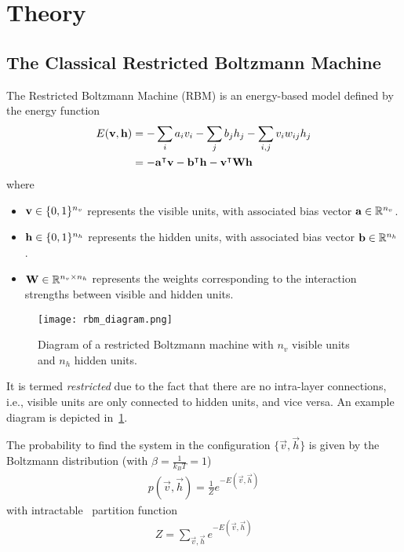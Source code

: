 \section{Theory}
\subsection{The Classical Restricted Boltzmann Machine}
The Restricted Boltzmann Machine (RBM) is an energy-based model defined by the energy function~\cite{goodfellow_deep_learning}
\begin{align}
\begin{split}
    E(\mathbf{v}, \mathbf{h})
        &= -\sum_i a_i v_i - \sum_j b_j h_j - \sum_{i,j} v_i w_{ij} h_j \\
        &= -\mathbf{a}^\intercal\mathbf{v} - \mathbf{b}^\intercal\mathbf{h} - \mathbf{v}^\intercal\mathbf{W}\mathbf{h}
\end{split}
\end{align}
where
\begin{itemize}
    \item \( \mathbf{v} \in \{0,1\}^{n_v} \) represents the visible units, with associated bias vector \( \mathbf{a} \in \mathbb{R}^{n_v} \).
    \item \( \mathbf{h} \in \{0,1\}^{n_h} \) represents the hidden units, with associated bias vector \( \mathbf{b} \in \mathbb{R}^{n_h} \).
    \item \( \mathbf{W} \in \mathbb{R}^{n_v \times n_h} \) represents the weights corresponding to the interaction strengths between visible and hidden units.
\end{itemize}

\begin{figure}[!htb]
    \begin{center}
        \texttt{[image: rbm\_diagram.png]}
    \end{center}
    \caption{Diagram of a restricted Boltzmann machine with \( n_v \) visible units and \( n_h \) hidden units.}
    \label{fig:rbm_diagram}
\end{figure}

It is termed \textit{restricted} due to the fact that there are no intra-layer connections, i.e., visible units are only connected to hidden units, and vice versa.
An example diagram is depicted in~\cref{fig:rbm_diagram}.

The probability to find the system in the configuration \( \{\vec{v},\vec{h}\} \) is given by the Boltzmann distribution (with \( \beta = \frac{1}{k_BT} = 1 \))
\begin{align}
    p(\vec{v}, \vec{h}) = \frac{1}{Z} e^{-E(\vec{v},\vec{h})}
\end{align}
with intractable~\cite{long_servedio_2010} partition function
\begin{align}
    Z = \sum_{\vec{v},\vec{h}} e^{-E(\vec{v},\vec{h})}
\end{align}


